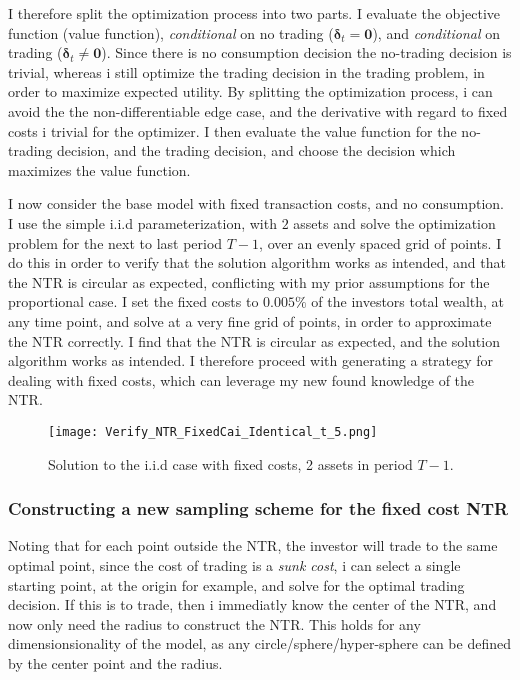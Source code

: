 \documentclass[11pt]{article}
\begin{document}
I therefore split the optimization process into two parts. I evaluate the objective function (value function), \textit{conditional} on no trading ($\boldsymbol{\delta}_{t} = \mathbf{0}$), and \textit{conditional} on trading ($\boldsymbol{\delta}_{t} \neq \mathbf{0}$).
Since there is no consumption decision the no-trading decision is trivial, whereas i still optimize the trading decision in the trading problem, in order to maximize expected utility. 
By splitting the optimization process, i can avoid the the non-differentiable edge case, and the derivative with regard to fixed costs i trivial for the optimizer.
I then evaluate the value function for the no-trading decision, and the trading decision, and choose the decision which maximizes the value function.

I now consider the base model with fixed transaction costs, and no consumption. I use the simple i.i.d parameterization, with $2$ assets and solve the optimization problem for the next to last period $T-1$,
over an evenly spaced grid of points. I do this in order to verify that the solution algorithm works as intended, and that the \ac{NTR} is circular as expected, conflicting with my prior assumptions for the proportional case.
I set the fixed costs to $0.005\%$ of the investors total wealth, at any time point, and solve at a very fine grid of points, in order to approximate the \ac{NTR} correctly.
I find that the \ac{NTR} is circular as expected, and the solution algorithm works as intended. I therefore proceed with generating a strategy for dealing with fixed costs, which can leverage my new found knowledge of the \ac{NTR}.
\begin{figure}[!ht]
    \centering
    \texttt{[image: Verify\_NTR\_FixedCai\_Identical\_t\_5.png]}
    \caption{Solution to the i.i.d case with fixed costs, 2 assets in period $T-1$.}
    \label{fig:NTR_verify_fixed_no_correlation}
\end{figure}

\subsubsection{Constructing a new sampling scheme for the fixed cost NTR} \label{Subsubsection: SampleFixed}
Noting that for each point outside the NTR, the investor will trade to the same optimal point, since the cost of trading is a \textit{sunk cost},
i can select a single starting point, at the origin for example, and solve for the optimal trading decision.
If this is to trade, then i immediatly know the center of the \ac{NTR}, and now only need the radius to construct the \ac{NTR}.
This holds for any dimensionsionality of the model, as any circle/sphere/hyper-sphere can be defined by the center point and the radius.
\end{document}

